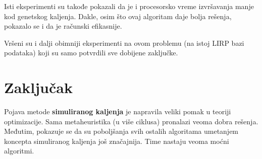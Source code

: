 \documentclass[a4paper]{article}
\begin{document}
Isti eksperimenti su takođe pokazali da je i procesorsko vreme izvršavanja manje kod genetskog kaljenja. Dakle, osim što ovaj algoritam daje bolja rešenja, pokazalo se i da je računski efikasnije. \par Vršeni su i dalji obimniji eksperimenti na ovom problemu\cite{gannealingaplication} (na istoj LIRP bazi podataka) koji su samo potvrdili sve dobijene zaključke.


\section{Zaključak}
\label{sec:zakljucak}

Pojava metode \textbf{simuliranog kaljenja} je napravila veliki pomak u teoriji optimizacije. Sama metaheuristika (u više ciklusa) pronalazi veoma dobra rešenja. Međutim, pokazuje se \cite{gannealingthesis, gannealingaplication} da su poboljšanja svih ostalih algoritama umetanjem koncepta simuliranog kaljenja još značajnija. Time nastaju veoma moćni algoritmi.


\newpage
{}

\appendix



\nocite{*}
\end{document}
